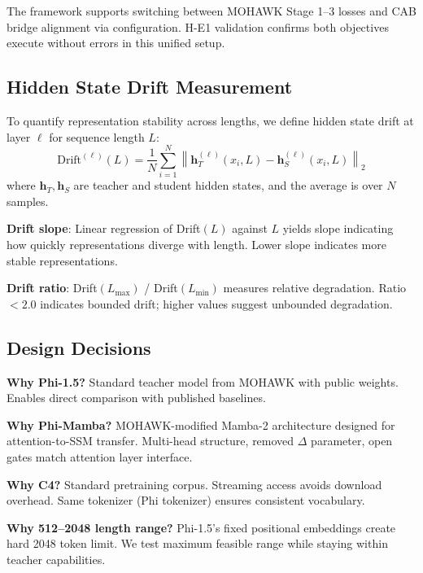 The framework supports switching between MOHAWK Stage 1--3 losses and CAB bridge alignment via configuration. H-E1 validation confirms both objectives execute without errors in this unified setup.

\subsection{Hidden State Drift Measurement}

To quantify representation stability across lengths, we define hidden state drift at layer $\ell$ for sequence length $L$:
\begin{equation}
\text{Drift}^{(\ell)}(L) = \frac{1}{N} \sum_{i=1}^{N} \left\| \mathbf{h}_T^{(\ell)}(x_i, L) - \mathbf{h}_S^{(\ell)}(x_i, L) \right\|_2
\end{equation}
where $\mathbf{h}_T, \mathbf{h}_S$ are teacher and student hidden states, and the average is over $N$ samples.

\textbf{Drift slope}: Linear regression of Drift$(L)$ against $L$ yields slope indicating how quickly representations diverge with length. Lower slope indicates more stable representations.

\textbf{Drift ratio}: Drift$(L_{\text{max}})$ / Drift$(L_{\text{min}})$ measures relative degradation. Ratio $< 2.0$ indicates bounded drift; higher values suggest unbounded degradation.

\subsection{Design Decisions}

\textbf{Why Phi-1.5?} Standard teacher model from MOHAWK with public weights. Enables direct comparison with published baselines.

\textbf{Why Phi-Mamba?} MOHAWK-modified Mamba-2 architecture designed for attention-to-SSM transfer. Multi-head structure, removed $\Delta$ parameter, open gates match attention layer interface.

\textbf{Why C4?} Standard pretraining corpus. Streaming access avoids download overhead. Same tokenizer (Phi tokenizer) ensures consistent vocabulary.

\textbf{Why 512--2048 length range?} Phi-1.5's fixed positional embeddings create hard 2048 token limit. We test maximum feasible range while staying within teacher capabilities.
